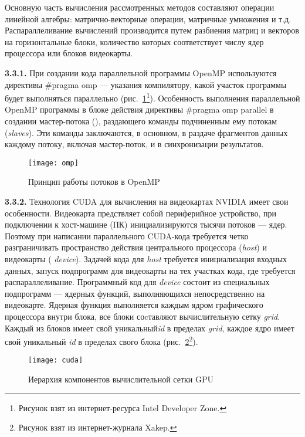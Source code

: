 Основную часть вычисления рассмотренных методов составляют операции линейной алгебры: матрично-векторные операции, матричные умножения и т.д. Распараллеливание вычислений производится путем разбиения матриц и векторов на горизонтальные блоки, количество которых соответствует числу ядер процессора или блоков видеокарты.

{\bfseries 3.3.1.} При создании кода параллельной программы OpenMP используются директивы \#pragma omp --- указания компилятору, какой участок программы будет выполняться параллельно (рис.~\ref{fig:omp}\footnote{Рисунок взят из интернет-ресурса Intel Developer Zone.}). Особенность выполнения параллельной OpenMP программы в блоке действия директивы \#pragma omp parallel в создании мастер-потока (), раздающего команды подчиненным ему потокам (\textit{slaves}). Эти команды заключаются, в основном, в раздаче фрагментов данных каждому потоку, включая мастер-поток, и в синхронизации результатов. 
\begin{figure}
	\centering
	\texttt{[image: omp]}
	\caption{Принцип работы потоков в OpenMP}
	\label{fig:omp}
\end{figure}

{\bfseries 3.3.2.} Технология CUDA для вычисления на видеокартах NVIDIA имеет свои особенности. Видеокарта предствляет собой периферийное устройство, при подключении к хост-машине (ПК) инициализируются тысячи потоков --- ядер. Поэтому при написании параллельного CUDA-кода требуется четко разграничивать пространство действия центрального процессора (\textit{host}) и видеокарты (\textit{ device}). Задачей кода для \textit{host} требуется инициализация входных данных, запуск подпрограмм для видеокарты на тех участках кода, где требуется распараллеливание. Программный код для \textit{device} состоит из специальных подпрограмм --- ядерных функций, выполняющихся непосредственно на видеокарте. Ядерная функция выполняется каждым ядром графического процессора внутри блока, все блоки соcтавляют вычислительную сетку \textit{grid}. Каждый из блоков имеет свой уникальный\textit{id} в пределах \textit{grid}, каждое ядро имеет свой уникальный \textit{id} в пределах свого блока (рис.~\ref{fig:cuda}\footnote{Рисунок взят из интернет-журнала Xakep.}).  

\begin{figure}
	\centering
	\texttt{[image: cuda]}
	\caption{Иерархия компонентов вычислительной сетки GPU}
	\label{fig:cuda}
\end{figure}


